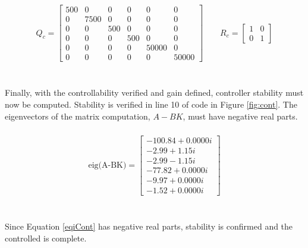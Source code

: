 \documentclass[12pt]{article}
\begin{document}
\begin{equation}
\label{qnr}
\begin{aligned}
Q_{c} = \begin{bmatrix} 500 & 0 & 0 & 0 & 0 & 0\\ 0 & 7500 & 0 & 0 & 0 & 0\\ 0 & 0 & 500 & 0 & 0 & 0\\ 0 & 0 & 0 & 500 & 0 & 0\\ 0 & 0 & 0 & 0 & 50000 & 0\\ 0 & 0 & 0 & 0 & 0 & 50000 \end{bmatrix}
\qquad
R_{c} = \begin{bmatrix}1 & 0\\ 0 & 1 \end{bmatrix}
\end{aligned}
\end{equation}
\\ \\
Finally, with the controllability verified and gain defined, controller stability must now be computed. Stability is verified in line 10 of code in Figure \ref{fig:cont}. The eigenvectors of the matrix computation,  $A-BK$, must have negative real parts.
\\ \\
\begin{equation} \label{eqiCont} \begin{aligned}
\textrm{eig(A-BK)} = \begin{bmatrix}
-100.84 + 0.0000i \\ -2.99 + 1.15i \\ -2.99 - 1.15i \\ -77.82 + 0.0000i \\ -9.97 + 0.0000i \\ -1.52 + 0.0000i

\end{bmatrix} \end{aligned} \end{equation}
\\ \\
Since Equation \eqref{eqiCont} has negative real parts, stability is confirmed and the controlled is complete.
\end{document}
